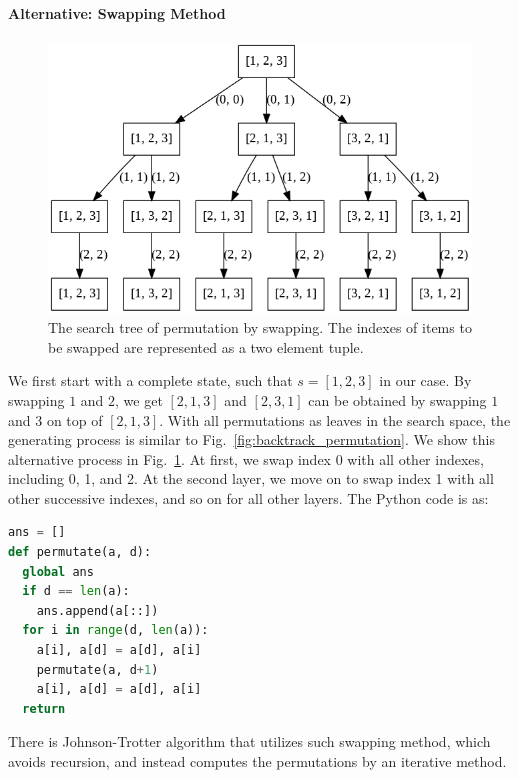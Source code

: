 \documentclass[../main.tex]{subfiles}
\begin{document}
\paragraph{Alternative: Swapping Method}   
\begin{figure}[h]
    \centering
    \includegraphics[width= 0.8\columnwidth]{fig/permutation_swap.png}
    \caption{The search tree of permutation by swapping. The indexes of items to be swapped are represented as a two element tuple. }
    \label{fig:backtrack_permutation_swap}
\end{figure}
We first start with a complete state, such that $s=[1, 2, 3]$ in our case. By swapping $1$ and $2$, we get $[2, 1, 3]$ and $[2, 3, 1]$ can be obtained by swapping $1$ and $3$ on top of $[2, 1, 3]$. With all permutations as leaves in the search space, the generating process is similar to Fig.~\ref{fig:backtrack_permutation}. We show this alternative process in Fig.~\ref{fig:backtrack_permutation_swap}. At first, we swap index 0 with all other indexes, including 0, 1, and 2. At the second layer, we move on to swap index 1 with all other successive indexes, and so on for all other layers.  The Python code is as:
\begin{lstlisting}[language=Python]
ans = []
def permutate(a, d):
  global ans
  if d == len(a):
    ans.append(a[::])
  for i in range(d, len(a)):
    a[i], a[d] = a[d], a[i]
    permutate(a, d+1)
    a[i], a[d] = a[d], a[i]
  return
\end{lstlisting}
There is Johnson-Trotter algorithm that utilizes such swapping method, which avoids recursion, and instead computes the permutations by an iterative method. 
\end{document}
